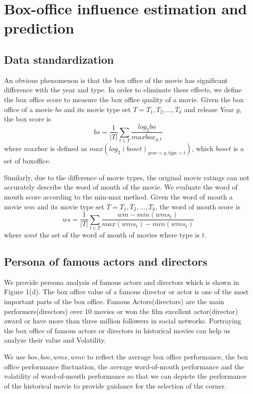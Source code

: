 \section{Box-office influence estimation and prediction}
\subsection{Data standardization}
An obvious phenomenon is that the box office of the movie has significant difference with the year and type. In order to eliminate these effects, we define the box office score to measure the box office quality of a movie. Given the box office of a movie $bo$ and its movie type set $T = {T_1,T_2,...,T_k}$ and release Year $y$, the box score is 
\begin{equation}
bs=\frac{1}{|T|}\sum_{t\in T}\frac{log_2bo}{maxbox_{y,t}}
\end{equation}
where $maxbox$ is defined as $max(log_2(boset)_{year=y,type=t})$, which $boset$ is a set of boxoffice.\\
\par Similarly, due to the difference of movie types, the original movie ratings can not accurately describe the word of mouth of the movie. We evaluate the word of mouth score according to the min-max method. Given the word of mouth a movie $wm$ and its movie type set $T = {T_1,T_2,...,T_k}$, the word of mouth score is 
\begin{equation}
ws=\frac{1}{|T|}\sum_{t\in T}\frac{wm-min(wms_t)}{max(wms_t)-min(wms_t)}
\end{equation}
where $wmt$ the set of the word of mouth of movies where type is $t$.
\subsection{Persona of famous actors and directors}
We provide persona analysis of famous actors and directors which is shown in Figure 1(d). The box office value of a famous director or actor is one of the most important parts of the box office. Famous Actors(directors) are the main performers(directors) over 10 movies or won the film excellent actor(director) award or have more than three million followers in social networks. Portraying the box office of famous actors or directors in historical movies can help us analyze their value and Volatility.
\par We use $bos,bov,wms,wmv$ to reflect the average box office performance, the box office performance fluctuation, the average word-of-mouth performance and the volatility of word-of-mouth performance so that we can depicte the performance of the historical movie to provide guidance for the selection of the corner.
